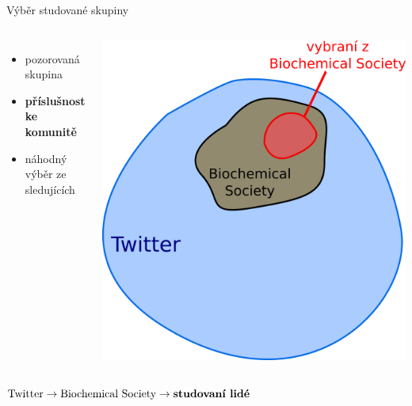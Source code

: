 \documentclass[notheorems,12pt]{beamer}
\begin{document}
\begin{frame}{Výběr studované skupiny}
    \vspace{-0.7cm}
    \begin{columns}
    \column{5cm}
    	\begin{itemize}
    		\item pozorovaná skupina
    		\item \textbf{příslušnost ke komunitě}
    		\item náhodný výběr ze sledujících
    	\end{itemize}
    \column{6cm}
    	\center
    	\includegraphics[scale=0.32]{./Pics/sets.png}
    \end{columns}
    \center
    \begin{large}
        $\text{Twitter} \rightarrow \text{Biochemical Society} \rightarrow \text{\textbf{studovaní lidé}}$
    \end{large}
\end{frame}
\end{document}

